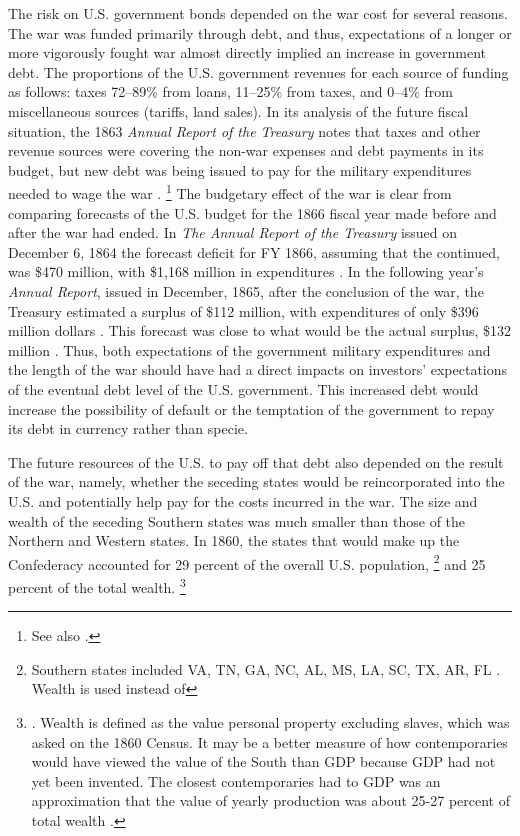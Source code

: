 The risk on U.S. government bonds depended on the war cost for several reasons.
The  war was funded primarily through debt, and thus, expectations of a longer or more vigorously fought war almost directly implied an increase in government debt.
The proportions of the U.S. government revenues for each source of funding as follows: taxes 72--89\% from loans, 11--25\% from taxes, and 0--4\% from miscellaneous sources (tariffs, land sales).
In its analysis of the future fiscal situation, the 1863 \textit{Annual Report of the Treasury} notes that taxes and other revenue sources were covering the non-war expenses and debt payments in its budget, but new debt was being issued to pay for the military expenditures needed to wage the war \parencite[10-13]{Treasury1863}.
\footnote{See also \textcite[][14]{Godfrey1976}.}
The budgetary effect of the war is clear from  comparing forecasts of the U.S. budget for the 1866 fiscal year made before and after the war had ended.
In \textit{The Annual Report of the  Treasury} issued on December 6, 1864 the forecast deficit for FY 1866, assuming that the continued, was \$470 million, with \$1,168 million in expenditures \parencite[13]{Treasury1864}.
In the following year's \textit{Annual Report}, issued in December, 1865, after the conclusion of the war, the Treasury estimated a surplus of \$112 million, with expenditures of only \$396 million dollars \parencite{Treasury1865}.
This forecast was close to what would be the actual surplus, \$132 million \parencite[2]{Treasury1866}.
Thus, both expectations of the government military expenditures and the length of the war should have had a direct impacts on investors' expectations of the eventual debt level of the U.S. government.
This increased debt would increase the possibility of default or the temptation of the government to repay its debt in currency rather than specie.

The future resources of the U.S. to pay off that debt also depended on the result of the war, namely, whether the seceding states would be reincorporated into the U.S. and potentially help pay for the costs incurred in the war.
The size and wealth of the seceding Southern states was much smaller than those of the Northern and Western states.
In 1860, the states that would make up the Confederacy accounted for 29 percent of the overall U.S. population,%
\footnote{
  Southern states included VA, TN, GA, NC, AL, MS, LA, SC, TX, AR, FL \textcite[5]{Eicher2001}.
  Wealth is used instead of
}
and 25 percent of the total wealth.%
\footnote{
  \textcite[12]{Elder1865}. Wealth is defined as the value personal property excluding slaves, which was asked on the 1860 Census.
  It may be a better measure of how contemporaries would have viewed the value of the South than GDP because GDP had not yet been invented.
  The closest contemporaries had to GDP was an approximation that the value of yearly production was about 25-27 percent of total wealth \parencites[7]{Elder1865}[24]{Treasury1865}.
}

